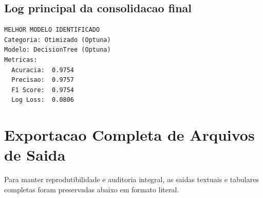 \documentclass[12pt,a4paper]{article}
\begin{document}
\subsection{Log principal da consolidacao final}
\begin{lstlisting}[style=plainlog]
MELHOR MODELO IDENTIFICADO
Categoria: Otimizado (Optuna)
Modelo: DecisionTree (Optuna)
Metricas:
  Acuracia:  0.9754
  Precisao:  0.9757
  F1 Score:  0.9754
  Log Loss:  0.0806
\end{lstlisting}

\section{Exportacao Completa de Arquivos de Saida}

Para manter reprodutibilidade e auditoria integral, as saidas textuais e tabulares completas foram preservadas abaixo em formato literal.









\end{document}
